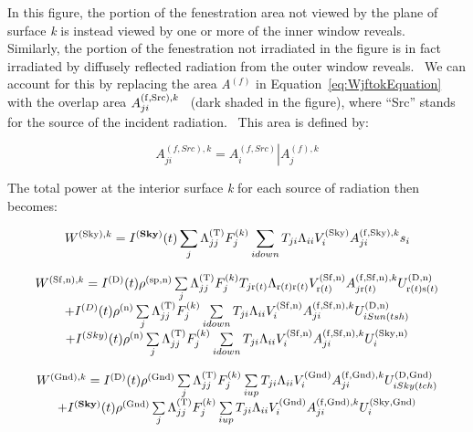 In this figure, the portion of the fenestration area not viewed by the plane of surface \emph{k} is instead viewed by one or more of the inner window reveals.~ Similarly, the portion of the fenestration not irradiated in the figure is in fact irradiated by diffusely reflected radiation from the outer window reveals.~ We can account for this by replacing the area \emph{A}\(^{(f)}\) in Equation~\ref{eq:WjftokEquation} with the overlap area \(A_{ji}^{{\rm{(f, Src), }}k}\) \emph{~}(dark shaded in the figure), where ``Src'' stands for the source of the incident radiation.~ This area is defined by:

\begin{equation}
A_{ji}^{\left( {f,Src} \right),k} = \left. {A_i^{\left( {f,Src} \right)}} \right|A_j^{\left( f \right),k}
\end{equation}

The total power at the interior surface \emph{k} for each source of radiation then becomes:

\begin{equation}
{W^{{\rm{(Sky), }}k}} = {I^{({\bf{Sky}})}}(t)\sum\limits_j {\Lambda_{jj}^{{\rm{(T)}}}F_j^{{\rm{(}}k{\rm{)}}}\sum\limits_{i{\rm{ }}down} {{T_{ji}}{\Lambda_{ii}}V_i^{{\rm{(Sky)}}}A_{ji}^{{\rm{(f, Sky), }}k}{s_i}} }
\end{equation}

\begin{equation}
\begin{array}{c}{W^{{\rm{(Sf,n)}},k}} = {I^{{\rm{(D)}}}}(t){\rho ^{{\rm{(sp, n)}}}}\sum\limits_j {\Lambda_{jj}^{{\rm{(T)}}}F_j^{{\rm{(}}k{\rm{)}}}{T_{j{\rm{ r(}}t{\rm{)}}}}{\Lambda_{{\rm{ r(}}t{\rm{) r(}}t{\rm{)}}}}V_{{\rm{ r(}}t{\rm{)}}}^{{\rm{(Sf, n)}}}A_{j{\rm{ r(}}t{\rm{)}}}^{{\rm{(f, Sf, n), }}k}U_{{\rm{ r(}}t{\rm{) s(}}t{\rm{)}}}^{{\rm{(D,n)}}}} \\ + {I^{(D)}}(t){\rho ^{{\rm{(n)}}}}\sum\limits_j {\Lambda_{jj}^{{\rm{(T)}}}F_j^{{\rm{(}}k{\rm{)}}}\sum\limits_{i{\rm{ }}down} {{T_{ji}}{\Lambda_{ii}}V_i^{{\rm{(Sf, n)}}}A_{ji}^{{\rm{(f, Sf, n), }}k}U_{i{\rm{ }}Sun(tsh)}^{{\rm{(D,n)}}}} } \\ + {I^{(Sky)}}(t){\rho ^{{\rm{(n)}}}}\sum\limits_j {\Lambda_{jj}^{{\rm{(T)}}}F_j^{{\rm{(}}k{\rm{)}}}\sum\limits_{i{\rm{ }}down} {{T_{ji}}{\Lambda_{ii}}V_i^{{\rm{(Sf, n)}}}A_{ji}^{{\rm{(f, Sf, n), }}k}U_i^{{\rm{(Sky,n)}}}} } \end{array}
\end{equation}

\begin{equation}
\begin{array}{c}{W^{{\rm{(Gnd)}},k}} = {I^{{\rm{(D)}}}}(t){\rho ^{{\rm{(Gnd)}}}}\sum\limits_j {\Lambda_{jj}^{{\rm{(T)}}}F_j^{{\rm{(}}k{\rm{)}}}\sum\limits_{i{\rm{ }}up} {{T_{ji}}{\Lambda_{ii}}V_i^{{\rm{(Gnd)}}}A_{ji}^{{\rm{(f, Gnd), }}k}U_{i{\rm{ }}Sky(tch)}^{{\rm{(D, Gnd)}}}} } \\ + {I^{({\bf{Sky}})}}(t){\rho ^{{\rm{(Gnd)}}}}\sum\limits_j {\Lambda_{jj}^{{\rm{(T)}}}F_j^{{\rm{(}}k{\rm{)}}}\sum\limits_{i{\rm{ }}up} {{T_{ji}}{\Lambda_{ii}}V_i^{{\rm{(Gnd)}}}A_{ji}^{{\rm{(f, Gnd), }}k}U_i^{{\rm{( Sky,Gnd)}}}} } \end{array}
\end{equation}


